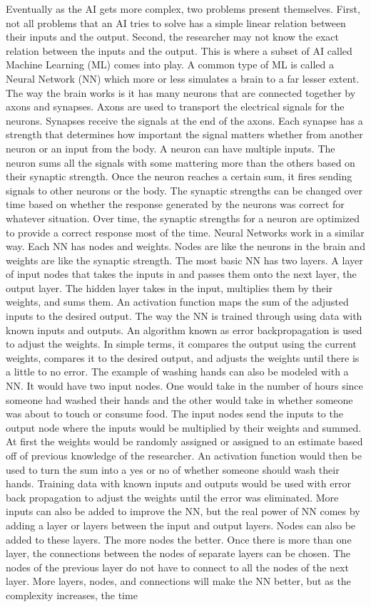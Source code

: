 \documentclass[]{article}
\begin{document}
		Eventually as the AI gets more complex, two problems present themselves. First, not all problems that an AI tries to solve has a simple linear relation between their inputs and the output. Second, the researcher may not know the exact relation between the inputs and the output. This is where a subset of AI called Machine Learning (ML) comes into play. A common type of ML is called a Neural Network (NN) which more or less simulates a brain to a far lesser extent. The way the brain works is it has many neurons that are connected together by axons and synapses. Axons are used to transport the electrical signals for the neurons. Synapses receive the signals at the end of the axons. Each synapse has a strength that determines how important the signal matters whether from another neuron or an input from the body. A neuron can have multiple inputs. The neuron sums all the signals with some mattering more than the others based on their synaptic strength. Once the neuron reaches a certain sum, it fires sending signals to other neurons or the body. The synaptic strengths can be changed over time based on whether the response generated by the neurons was correct for whatever situation. Over time, the synaptic strengths for a neuron are optimized to provide a correct response most of the time. Neural Networks work in a similar way. Each NN has nodes and weights. Nodes are like the neurons in the brain and weights are like the synaptic strength. The most basic NN has two layers. A layer of input nodes that takes the inputs in and passes them onto the next layer, the output layer. The hidden layer takes in the input, multiplies them by their weights, and sums them. An activation function maps the sum of the adjusted inputs to the desired output. The way the NN is trained through using data with known inputs and outputs. An algorithm known as error backpropagation is used to adjust the weights. In simple terms, it compares the output using the current weights, compares it to the desired output, and adjusts the weights until there is a little to no error. The example of washing hands can also be modeled with a NN. It would have two input nodes. One would take in the number of hours since someone had washed their hands and the other would take in whether someone was about to touch or consume food. The input nodes send the inputs to the output node where the inputs would be multiplied by their weights and summed. At first the weights would be randomly assigned or assigned to an estimate based off of previous knowledge of the researcher. An activation function would then be used to turn the sum into a yes or no of whether someone should wash their hands. Training data with known inputs and outputs would be used with error back propagation to adjust the weights until the error was eliminated. More inputs can also be added to improve the NN, but the real power of NN comes by adding a layer or layers between the input and output layers. Nodes can also be added to these layers. The more nodes the better. Once there is more than one layer, the connections between the nodes of separate layers can be chosen. The nodes of the previous layer do not have to connect to all the nodes of the next layer. More layers, nodes, and connections will make the NN better, but as the complexity increases, the time 
\end{document}
